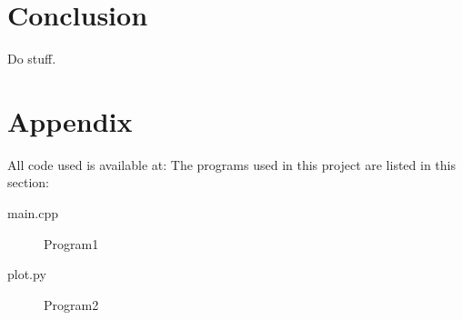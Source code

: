 \documentclass[%
 reprint,
 nobalance,
 amsmath,amssymb,
 aps,
]{revtex4-1}
\begin{document}
\section{Conclusion}
Do stuff.

\section{Appendix}
All code used is available at: %
The programs used in this project are listed in this section:

\begin{description}
\item [main.cpp] Program1
\item [plot.py] Program2
\end{description}

\end{document}
